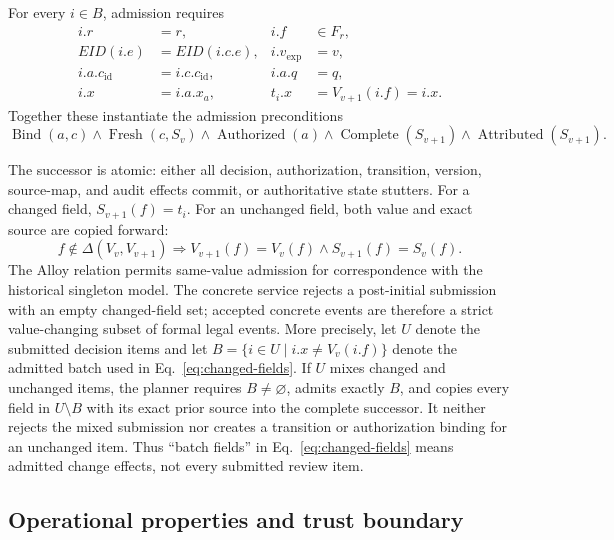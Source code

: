 For every $i\in B$, admission requires
\begin{align}
i.r &= r, & i.f&\in F_r,\nonumber\\
EID(i.e) &= EID(i.c.e), & i.v_{\mathrm{exp}}&=v,\nonumber\\
i.a.c_{\mathrm{id}}&=i.c.c_{\mathrm{id}}, & i.a.q&=q,\nonumber\\
i.x&=i.a.x_a, & t_i.x&=V_{v+1}(i.f)=i.x.
\label{eq:item-bindings}
\end{align}
Together these instantiate the admission preconditions
\begin{equation}
\operatorname{Bind}(a,c)\land\operatorname{Fresh}(c,S_v)\land
\operatorname{Authorized}(a)\land\operatorname{Complete}(S_{v+1})\land
\operatorname{Attributed}(S_{v+1}).
\end{equation}

The successor is atomic: either all decision, authorization, transition, version, source-map, and audit effects commit, or authoritative state stutters. For a changed field, $S_{v+1}(f)=t_i$. For an unchanged field, both value and exact source are copied forward:
\begin{equation}
f\notin\Delta(V_v,V_{v+1})\Rightarrow
V_{v+1}(f)=V_v(f)\land S_{v+1}(f)=S_v(f).
\label{eq:copy-forward}
\end{equation}
The Alloy relation permits same-value admission for correspondence with the historical singleton model. The concrete service rejects a post-initial submission with an empty changed-field set; accepted concrete events are therefore a strict value-changing subset of formal legal events. More precisely, let $U$ denote the submitted decision items and let $B=\{i\in U\mid i.x\neq V_v(i.f)\}$ denote the admitted batch used in Eq.~\eqref{eq:changed-fields}. If $U$ mixes changed and unchanged items, the planner requires $B\neq\varnothing$, admits exactly $B$, and copies every field in $U\setminus B$ with its exact prior source into the complete successor. It neither rejects the mixed submission nor creates a transition or authorization binding for an unchanged item. Thus ``batch fields'' in Eq.~\eqref{eq:changed-fields} means admitted change effects, not every submitted review item.

\subsection{Operational properties and trust boundary}

